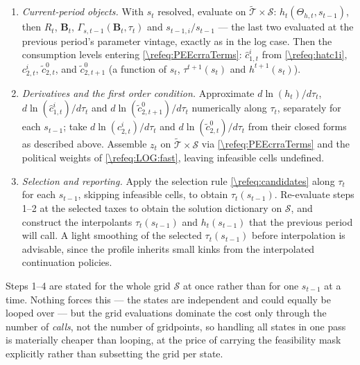 \documentclass[a4paper]{article}
\begin{document}
\begin{alg}
\begin{enumerate}
    \item \emph{Current-period objects.} With $s_t$ resolved, evaluate on $\tilde{\mathcal{T}}\times\mathcal{S}$: $h_t\left(\Theta_{h,t}, s_{t-1}\right)$, then $R_t$, $\bm{B}_t$, $\Gamma_{s,t-1}\left(\bm{B}_t, \tau_t\right)$ and $s_{t-1,i}/s_{t-1}$ --- the last two evaluated at the previous period's parameter vintage, exactly as in the log case. Then the consumption levels entering \eqref{\refeq:PEEcrraTerms}: $\hat{c}_{1,t}^i$ from \eqref{\refeq:hatc1i}, $c_{2,t}^i$, $\tilde{c}_{2,t}^0$, and $\tilde{c}_{2,t+1}^0$ (a function of $s_t$, $\tau^{t+1}(s_t)$ and $h^{t+1}(s_t)$).

    \item \emph{Derivatives and the first order condition.} Approximate $d\ln(h_t)/d\tau_t$, $d\ln(\hat{c}_{1,t}^i)/d\tau_t$ and $d\ln(\tilde{c}_{2,t+1}^0)/d\tau_t$ numerically along $\tau_t$, separately for each $s_{t-1}$; take $d\ln(c_{2,t}^i)/d\tau_t$ and $d\ln(\tilde{c}_{2,t}^0)/d\tau_t$ from their closed forms as described above. Assemble $z_t$ on $\tilde{\mathcal{T}}\times\mathcal{S}$ via \eqref{\refeq:PEEcrraTerms} and the political weights of \eqref{\refeq:LOG:fast}, leaving infeasible cells undefined.

    \item \emph{Selection and reporting.} Apply the selection rule \eqref{\refeq:candidates} along $\tau_t$ for each $s_{t-1}$, skipping infeasible cells, to obtain $\tau_t(s_{t-1})$. Re-evaluate steps 1--2 at the selected taxes to obtain the solution dictionary on $\mathcal{S}$, and construct the interpolants $\tau_t(s_{t-1})$ and $h_t(s_{t-1})$ that the previous period will call. A light smoothing of the selected $\tau_t(s_{t-1})$ before interpolation is advisable, since the profile inherits small kinks from the interpolated continuation policies.
\end{enumerate}

Steps 1--4 are stated for the whole grid $\mathcal{S}$ at once rather than for one $s_{t-1}$ at a time. Nothing forces this --- the states are independent and could equally be looped over --- but the grid evaluations dominate the cost only through the number of \emph{calls}, not the number of gridpoints, so handling all states in one pass is materially cheaper than looping, at the price of carrying the feasibility mask explicitly rather than subsetting the grid per state.
\end{alg}
\end{document}
